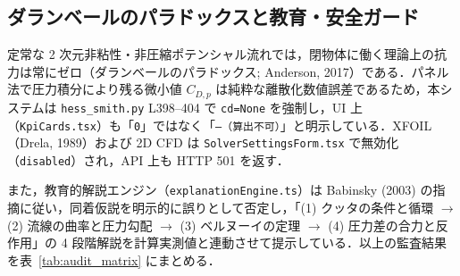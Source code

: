 \documentclass[10pt,a4paper]{article}
\begin{document}
\subsection{ダランベールのパラドックスと教育・安全ガード}
定常な 2 次元非粘性・非圧縮ポテンシャル流れでは，閉物体に働く理論上の抗力は常にゼロ（ダランベールのパラドックス; Anderson, 2017）である．パネル法で圧力積分により残る微小値 $C_{D,p}$ は純粋な離散化数値誤差であるため，本システムは \texttt{hess\_smith.py} L398--404 で \texttt{cd=None} を強制し，UI 上（\texttt{KpiCards.tsx}）も「\texttt{0}」ではなく「\texttt{—（算出不可）}」と明示している．XFOIL（Drela, 1989）および 2D CFD は \texttt{SolverSettingsForm.tsx} で無効化（\texttt{disabled}）され，API 上も HTTP 501 を返す．

また，教育的解説エンジン（\texttt{explanationEngine.ts}）は Babinsky (2003) の指摘に従い，同着仮説を明示的に誤りとして否定し，「(1) クッタの条件と循環 $\to$ (2) 流線の曲率と圧力勾配 $\to$ (3) ベルヌーイの定理 $\to$ (4) 圧力差の合力と反作用」の 4 段階解説を計算実測値と連動させて提示している．以上の監査結果を表~\ref{tab:audit_matrix} にまとめる．
\end{document}
